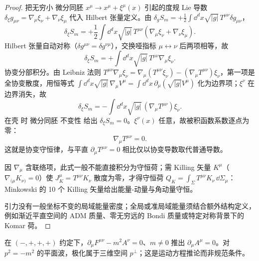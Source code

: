 \begin{proof}
把无穷小 微分同胚 $x^\mu\to x^\mu+\xi^\mu(x)$ 引起的度规 Lie 导数 $\delta_\xi g_{\mu\nu}=\nabla_\mu\xi_\nu+\nabla_\nu\xi_\mu$ 代入 Hilbert 张量定义。由 $\delta_g S_m=+\frac12\int\dd^dx\sqrt{|g|}\,T^{\mu\nu}\delta g_{\mu\nu}$，
\begin{equation*}
\delta_\xi S_m=+\frac12\int\dd^dx\sqrt{|g|}\,T^{\mu\nu}(\nabla_\mu\xi_\nu+\nabla_\nu\xi_\mu).
\end{equation*}
Hilbert 张量自动对称（$\delta g^{\mu\nu}=\delta g^{\nu\mu}$），交换哑指标 $\mu\leftrightarrow\nu$ 后两项相等，故
\begin{equation*}
\delta_\xi S_m=+\int\dd^dx\sqrt{|g|}\,T^{\mu\nu}\nabla_\mu\xi_\nu.
\end{equation*}
协变分部积分。由 Leibniz 法则 $T^{\mu\nu}\nabla_\mu\xi_\nu=\nabla_\mu(T^{\mu\nu}\xi_\nu)-(\nabla_\mu T^{\mu\nu})\xi_\nu$，第一项是全协变散度，用恒等式 $\int\dd^dx\sqrt{|g|}\,\nabla_\mu V^\mu=\int\dd^dx\,\partial_\mu(\sqrt{|g|}V^\mu)$ 化为边界项；$\xi^\nu$ 在边界消失，故
\begin{equation*}
\delta_\xi S_m=-\int\dd^dx\sqrt{|g|}\,(\nabla_\mu T^{\mu\nu})\xi_\nu.
\end{equation*}
在壳 时 微分同胚 不变性 给出 $\delta_\xi S_m=0$。$\xi^\nu(x)$ 任意，故被积函数系数逐点为零：
\begin{equation}\label{eq:ms-curved-T-conservation}
{\nabla_\mu T^{\mu\nu}=0.}
\end{equation}
这就是协变守恒律，与平直 $\partial_\mu T^{\mu\nu}=0$ 相比仅以协变导数取代普通导数。

因 $\nabla_\mu$ 含联络项，此式一般不能直接积分为守恒荷；需 Killing 矢量 $K^\mu$（$\nabla_{(\mu}K_{\nu)}=0$）使 $J_K^\mu=T^{\mu\nu}K_\nu$ 散度为零，才得守恒荷 $Q_K=\int_\Sigma T^{\mu\nu}K_\nu\,\dd\Sigma_\mu$：Minkowski 的 10 个 Killing 矢量给出能量-动量与角动量守恒。

引力没有一般坐标不变的局域能量密度；全局或准局域能量须结合额外结构定义，例如渐近平直空间的 ADM 质量、零无穷远的 Bondi 质量或特定对称背景下的 Komar 荷。
\end{proof}

\begin{proposition}
在 $(-,+,+,+)$ 约定下，$\partial_\mu F^{\mu\nu}-m^2A^\nu=0$、$m\ne0$ 推出 $\partial_\mu A^\mu=0$。对 $p^2=-m^2$ 的平面波，极化属于三维空间 $p^\perp$；这是运动方程推论而非规范条件。
\end{proposition}

